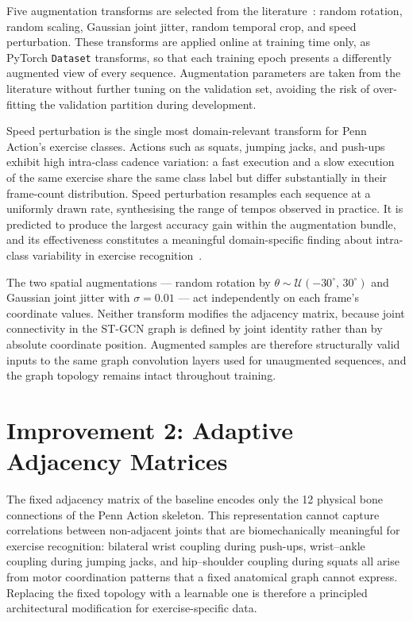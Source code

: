 Five augmentation transforms are selected from the literature~\cite{xin2024enhancing}: random rotation, random scaling, Gaussian joint jitter, random temporal crop, and speed perturbation. These transforms are applied online at training time only, as PyTorch \texttt{Dataset} transforms, so that each training epoch presents a differently augmented view of every sequence. Augmentation parameters are taken from the literature without further tuning on the validation set, avoiding the risk of over-fitting the validation partition during development.

Speed perturbation is the single most domain-relevant transform for Penn Action's exercise classes. Actions such as squats, jumping jacks, and push-ups exhibit high intra-class cadence variation: a fast execution and a slow execution of the same exercise share the same class label but differ substantially in their frame-count distribution. Speed perturbation resamples each sequence at a uniformly drawn rate, synthesising the range of tempos observed in practice. It is predicted to produce the largest accuracy gain within the augmentation bundle, and its effectiveness constitutes a meaningful domain-specific finding about intra-class variability in exercise recognition~\cite{xin2024enhancing}.

The two spatial augmentations --- random rotation by $\theta \sim \mathcal{U}(-30^\circ,\,30^\circ)$ and Gaussian joint jitter with $\sigma = 0.01$ --- act independently on each frame's coordinate values. Neither transform modifies the adjacency matrix, because joint connectivity in the ST-GCN graph is defined by joint identity rather than by absolute coordinate position. Augmented samples are therefore structurally valid inputs to the same graph convolution layers used for unaugmented sequences, and the graph topology remains intact throughout training.

\section{Improvement 2: Adaptive Adjacency Matrices}
\label{sec:adaptive-rationale}

The fixed adjacency matrix of the baseline encodes only the 12 physical bone connections of the Penn Action skeleton. This representation cannot capture correlations between non-adjacent joints that are biomechanically meaningful for exercise recognition: bilateral wrist coupling during push-ups, wrist--ankle coupling during jumping jacks, and hip--shoulder coupling during squats all arise from motor coordination patterns that a fixed anatomical graph cannot express. Replacing the fixed topology with a learnable one is therefore a principled architectural modification for exercise-specific data.

